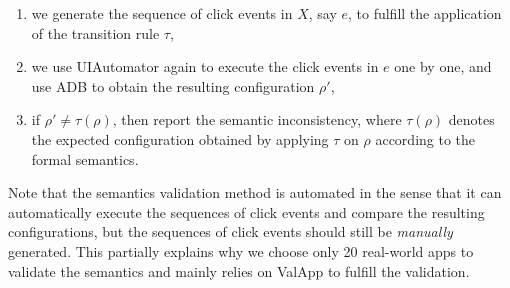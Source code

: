 \begin{enumerate}
\item we generate the sequence of click events in $X$, say $e$, to fulfill the application of the transition rule  $\tau$,   
%
%
\item we use UIAutomator again to execute the click events in $e$ one by one, and use ADB to obtain the resulting configuration $\rho'$,
%
\item if $\rho' \neq \tau(\rho)$, then report the semantic inconsistency, where 
$\tau(\rho)$ denotes the expected configuration obtained by applying $\tau$ on $\rho$ according to the formal semantics. 
\end{enumerate}
Note that the semantics validation method is automated in the sense that it can automatically execute the sequences of click events and compare the resulting configurations, but the sequences of click events should still be \emph{manually} generated. This partially explains why we choose only 20 real-world apps to validate the semantics and mainly relies on ValApp to fulfill the validation. 

